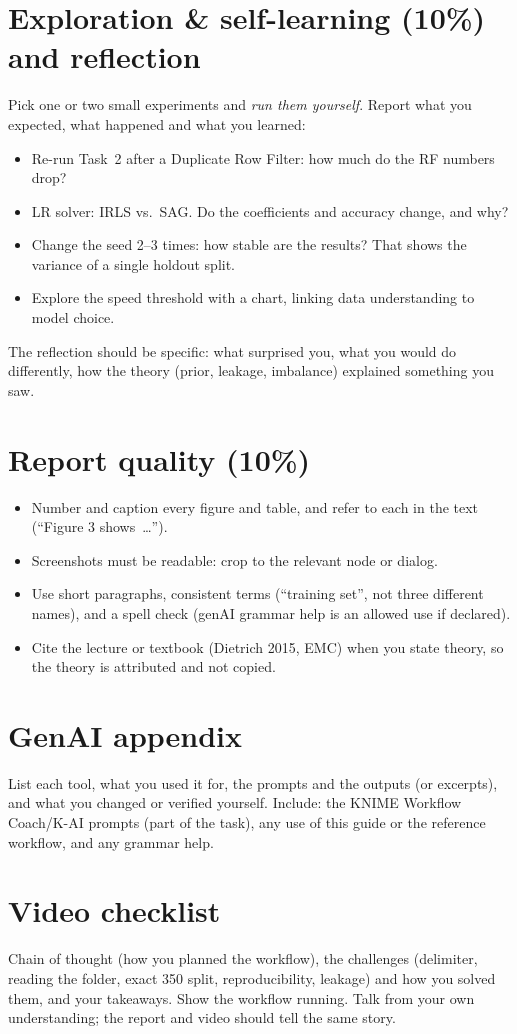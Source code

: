 \documentclass[11pt,a4paper]{article}
\begin{document}
\section{Exploration \& self-learning (10\%) and reflection}
Pick one or two small experiments and \emph{run them yourself}. Report what you expected, what
happened and what you learned:
\begin{itemize}
  \item Re-run Task~2 after a Duplicate Row Filter: how much do the RF numbers drop?
  \item LR solver: IRLS vs.\ SAG. Do the coefficients and accuracy change, and why?
  \item Change the seed 2--3 times: how stable are the results? That shows the variance of a single holdout split.
  \item Explore the speed threshold with a chart, linking data understanding to model choice.
\end{itemize}
The reflection should be specific: what surprised you, what you would do differently, how the
theory (prior, leakage, imbalance) explained something you saw.

\section{Report quality (10\%)}
\begin{itemize}
  \item Number and caption every figure and table, and refer to each in the text (``Figure 3 shows~\dots'').
  \item Screenshots must be readable: crop to the relevant node or dialog.
  \item Use short paragraphs, consistent terms (``training set'', not three different names), and a
        spell check (genAI grammar help is an allowed use if declared).
  \item Cite the lecture or textbook (Dietrich 2015, EMC) when you state theory, so the theory is
        attributed and not copied.
\end{itemize}

\section{GenAI appendix}
List each tool, what you used it for, the prompts and the outputs (or excerpts), and what you changed
or verified yourself. Include: the KNIME Workflow Coach/K-AI prompts (part of the task), any use of
this guide or the reference workflow, and any grammar help.

\section{Video checklist}
Chain of thought (how you planned the workflow), the challenges (delimiter, reading the folder, exact
350 split, reproducibility, leakage) and how you solved them, and your takeaways. Show the workflow
running. Talk from your own understanding; the report and video should tell the same story.
\end{document}
